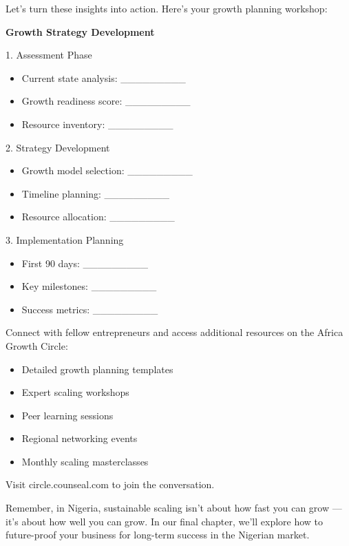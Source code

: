 Let's turn these insights into action. Here's your growth planning workshop:

\begin{workshopbox}
\textbf{Growth Strategy Development}

1. Assessment Phase
\begin{itemize}
    \item Current state analysis: \_\_\_\_\_\_\_\_\_
    \item Growth readiness score: \_\_\_\_\_\_\_\_\_
    \item Resource inventory: \_\_\_\_\_\_\_\_\_
\end{itemize}

2. Strategy Development
\begin{itemize}
    \item Growth model selection: \_\_\_\_\_\_\_\_\_
    \item Timeline planning: \_\_\_\_\_\_\_\_\_
    \item Resource allocation: \_\_\_\_\_\_\_\_\_
\end{itemize}

3. Implementation Planning
\begin{itemize}
    \item First 90 days: \_\_\_\_\_\_\_\_\_
    \item Key milestones: \_\_\_\_\_\_\_\_\_
    \item Success metrics: \_\_\_\_\_\_\_\_\_
\end{itemize}
\end{workshopbox}

\begin{communitybox}
Connect with fellow entrepreneurs and access additional resources on the Africa Growth Circle:
\begin{itemize}
    \item Detailed growth planning templates
    \item Expert scaling workshops
    \item Peer learning sessions
    \item Regional networking events
    \item Monthly scaling masterclasses
\end{itemize}
Visit circle.counseal.com to join the conversation.
\end{communitybox}

\begin{importantbox}
Remember, in Nigeria, sustainable scaling isn't about how fast you can grow --- it's about how well you can grow. In our final chapter, we'll explore how to future-proof your business for long-term success in the Nigerian market.
\end{importantbox}